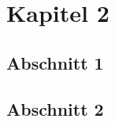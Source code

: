 \chapter{Kapitel 2}
\label{cha:kap2}


\section{Abschnitt 1}
\label{sec:kap2ab1}


\section{Abschnitt 2}
\label{sec:kap2ab2}

